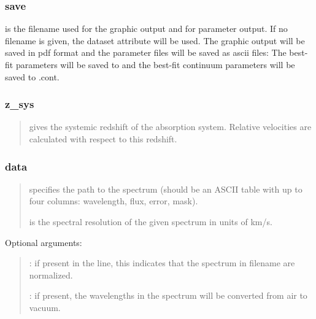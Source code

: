 \documentclass[letterpaper,10pt,english]{sphinxmanual}
\begin{document}
\subsubsection{save}
\label{\detokenize{documentation:save}}

 is the filename used for the graphic output and for parameter output.
If no filename is given, the dataset  attribute will be used.
The graphic output will be saved in pdf format and the parameter files will be saved as ascii files:
The best-fit parameters will be saved to  and the best-fit continuum parameters will be saved to .cont.


\subsubsection{z\_sys}
\label{\detokenize{documentation:z-sys}}
\begin{quote}

 gives the systemic redshift of the absorption system.
Relative velocities are calculated with respect to this redshift.
\end{quote}


\subsubsection{data}
\label{\detokenize{documentation:data}}
\begin{quote}

 specifies the path to the spectrum
(should be an ASCII table with up to four columns: wavelength, flux, error, mask).

  is the spectral resolution of the given spectrum in units of km/s.
\end{quote}

Optional arguments:
\begin{quote}

 : if present in the line, this indicates that the spectrum in filename are normalized.

 : if present, the wavelengths in the spectrum will be converted from air to vacuum.
\end{quote}
\end{document}
